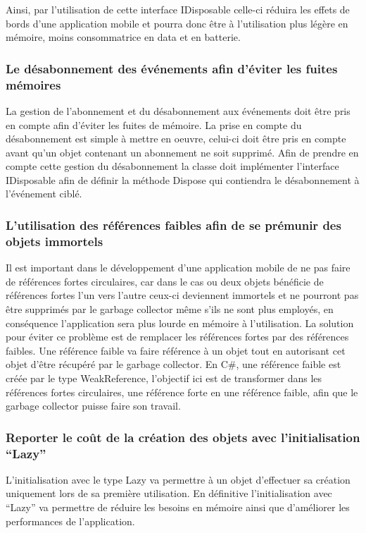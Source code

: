 \documentclass[11]{article}
\begin{document}
 Ainsi, par l’utilisation de cette interface IDisposable celle-ci réduira les effets de bords d’une application mobile et pourra donc être à l’utilisation plus légère en mémoire, moins consommatrice en data et en batterie.
 
\subsubsection{Le désabonnement des événements afin d’éviter les fuites mémoires}
  
 La gestion de l’abonnement et du désabonnement aux événements doit être pris en compte afin d’éviter les fuites de mémoire. La prise en compte du désabonnement est simple à mettre en oeuvre, celui-ci doit être pris en compte avant qu’un objet contenant un abonnement ne soit supprimé. Afin de prendre en compte cette gestion du désabonnement la classe doit implémenter l’interface IDisposable afin de définir la méthode Dispose qui contiendra le désabonnement à l'événement ciblé.
 
 
\subsubsection{L’utilisation des références faibles afin de se prémunir des objets immortels}
  
Il est important dans le développement d’une application mobile de ne pas faire de références fortes circulaires, car dans le cas ou deux objets bénéficie de références fortes l’un vers l’autre ceux-ci deviennent immortels et ne pourront pas être supprimés par le garbage collector même s'ils ne sont plus employés, en conséquence l’application sera plus lourde en mémoire à l’utilisation. 
La solution pour éviter ce problème est de remplacer les références fortes par des références faibles. Une référence faible va faire référence à un objet tout en autorisant cet objet d’être récupéré par le garbage collector. En C#, une référence faible est créée par le type WeakReference, l’objectif ici est de transformer dans les références fortes circulaires, une référence forte en une référence faible, afin que le garbage collector puisse faire son travail.

\subsubsection{Reporter le coût de la création des objets avec l’initialisation “Lazy” }
  
L’initialisation avec le type Lazy va permettre à un objet d’effectuer sa création uniquement lors de sa première utilisation. En définitive l’initialisation avec “Lazy” va permettre de réduire les besoins en mémoire ainsi que d’améliorer les performances de l’application.
 
\end{document}
